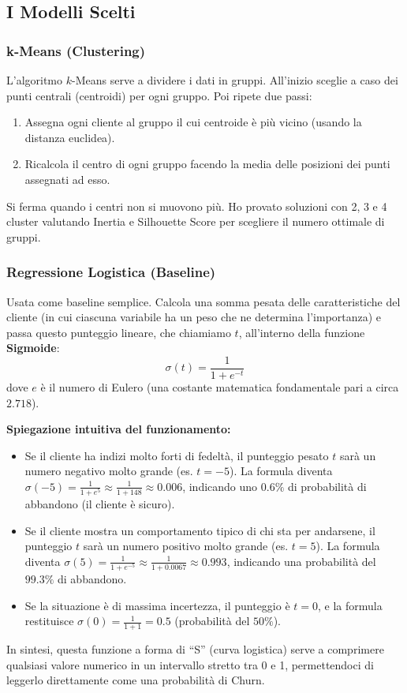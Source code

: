 \documentclass[a4paper,11pt]{article}
\begin{document}
\subsection{I Modelli Scelti}

\subsubsection{k-Means (Clustering)}
L'algoritmo $k$-Means serve a dividere i dati in gruppi. All'inizio sceglie a caso dei punti centrali (centroidi) per ogni gruppo. Poi ripete due passi:
\begin{enumerate}
    \item Assegna ogni cliente al gruppo il cui centroide è più vicino (usando la distanza euclidea).
    \item Ricalcola il centro di ogni gruppo facendo la media delle posizioni dei punti assegnati ad esso.
\end{enumerate}
Si ferma quando i centri non si muovono più. Ho provato soluzioni con 2, 3 e 4 cluster valutando Inertia e Silhouette Score per scegliere il numero ottimale di gruppi.

\subsubsection{Regressione Logistica (Baseline)}
Usata come baseline semplice. Calcola una somma pesata delle caratteristiche del cliente (in cui ciascuna variabile ha un peso che ne determina l'importanza) e passa questo punteggio lineare, che chiamiamo $t$, all'interno della funzione \textbf{Sigmoide}:
\begin{equation}
    \sigma(t) = \frac{1}{1 + e^{-t}}
\end{equation}
dove $e$ è il numero di Eulero (una costante matematica fondamentale pari a circa $2.718$).

\textbf{Spiegazione intuitiva del funzionamento:}
\begin{itemize}
    \item Se il cliente ha indizi molto forti di fedeltà, il punteggio pesato $t$ sarà un numero negativo molto grande (es. $t = -5$). La formula diventa $\sigma(-5) = \frac{1}{1 + e^5} \approx \frac{1}{1 + 148} \approx 0.006$, indicando uno $0.6\%$ di probabilità di abbandono (il cliente è sicuro).
    \item Se il cliente mostra un comportamento tipico di chi sta per andarsene, il punteggio $t$ sarà un numero positivo molto grande (es. $t = 5$). La formula diventa $\sigma(5) = \frac{1}{1 + e^{-5}} \approx \frac{1}{1 + 0.0067} \approx 0.993$, indicando una probabilità del $99.3\%$ di abbandono.
    \item Se la situazione è di massima incertezza, il punteggio è $t = 0$, e la formula restituisce $\sigma(0) = \frac{1}{1+1} = 0.5$ (probabilità del $50\%$).
\end{itemize}
In sintesi, questa funzione a forma di ``S'' (curva logistica) serve a comprimere qualsiasi valore numerico in un intervallo stretto tra 0 e 1, permettendoci di leggerlo direttamente come una probabilità di Churn.
\end{document}
